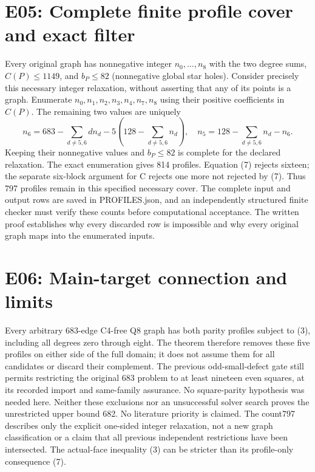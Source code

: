 \documentclass{article}
\begin{document}
\section{E05: Complete finite profile cover and exact filter}
Every original graph has nonnegative integer $n_0,\ldots,n_8$ with
the two degree sums, $C(P)\le1149$, and $b_P\le82$ (nonnegative global
star holes). Consider precisely this necessary integer relaxation,
without asserting that any of its points is a graph.
Enumerate $n_0,n_1,n_2,n_3,n_4,n_7,n_8$ using their positive coefficients
in $C(P)$. The remaining two values are uniquely
\[
 n_6=683-\sum_{d\ne5,6}dn_d-5\left(128-\sum_{d\ne5,6}n_d\right),
 \quad n_5=128-\sum_{d\ne5,6}n_d-n_6.
\]
Keeping their nonnegative values and $b_P\le82$ is complete for the
declared relaxation. The exact enumeration gives 814 profiles.
Equation (7) rejects sixteen; the separate six-block argument for C
rejects one more not rejected by (7). Thus 797 profiles remain in this
specified necessary cover. The complete input and output rows are saved
in PROFILES.json, and an independently structured finite checker must
verify these counts before computational acceptance. The written proof
establishes why every discarded row is impossible and why every original
graph maps into the enumerated inputs.

\section{E06: Main-target connection and limits}
Every arbitrary 683-edge C4-free Q8 graph has both parity profiles
subject to (3), including all degrees zero through eight. The theorem
therefore removes these five profiles on either side of the full domain;
it does not assume them for all candidates or discard their complement.
The previous odd-small-defect gate still permits restricting the original
683 problem to at least nineteen even squares, at its recorded import
and same-family assurance. No square-parity hypothesis was needed here.
Neither these exclusions nor an unsuccessful solver search proves the
unrestricted upper bound 682. No literature priority is claimed.
The count797 describes only the explicit one-sided integer relaxation,
not a new graph classification or a claim that all previous independent
restrictions have been intersected. The actual-face inequality (3) can
be stricter than its profile-only consequence (7).
\end{document}
